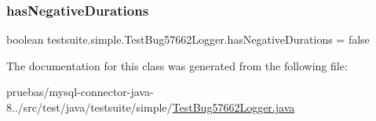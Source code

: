 \subsubsection{\texorpdfstring{has\+Negative\+Durations}{hasNegativeDurations}}
{\footnotesize\ttfamily boolean testsuite.\+simple.\+Test\+Bug57662\+Logger.\+has\+Negative\+Durations = false}



The documentation for this class was generated from the following file\+:\begin{DoxyCompactItemize}
\item 
pruebas/mysql-\/connector-\/java-\/8../src/test/java/testsuite/simple/\mbox{\hyperlink{_test_bug57662_logger_8java}{Test\+Bug57662\+Logger.\+java}}\end{DoxyCompactItemize}
